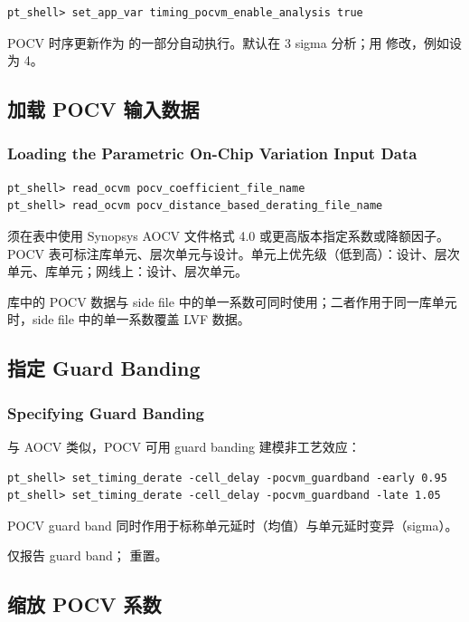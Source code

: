 \begin{lstlisting}
pt_shell> set_app_var timing_pocvm_enable_analysis true
\end{lstlisting}

POCV 时序更新作为  的一部分自动执行。默认在 3 sigma 分析；用  修改，例如设为 4。

\subsection{加载 POCV 输入数据}
\subsubsection*{Loading the Parametric On-Chip Variation Input Data}

\begin{lstlisting}
pt_shell> read_ocvm pocv_coefficient_file_name
pt_shell> read_ocvm pocv_distance_based_derating_file_name
\end{lstlisting}

须在表中使用 Synopsys AOCV 文件格式 4.0 或更高版本指定系数或降额因子。POCV 表可标注库单元、层次单元与设计。单元上优先级（低到高）：设计、层次单元、库单元；网线上：设计、层次单元。

库中的 POCV 数据与 side file 中的单一系数可同时使用；二者作用于同一库单元时，side file 中的单一系数覆盖 LVF 数据。

\subsection{指定 Guard Banding}
\subsubsection*{Specifying Guard Banding}

与 AOCV 类似，POCV 可用 guard banding 建模非工艺效应：
\begin{lstlisting}
pt_shell> set_timing_derate -cell_delay -pocvm_guardband -early 0.95
pt_shell> set_timing_derate -cell_delay -pocvm_guardband -late 1.05
\end{lstlisting}

POCV guard band 同时作用于标称单元延时（均值）与单元延时变异（sigma）。

 仅报告 guard band； 重置。

\subsection{缩放 POCV 系数}
